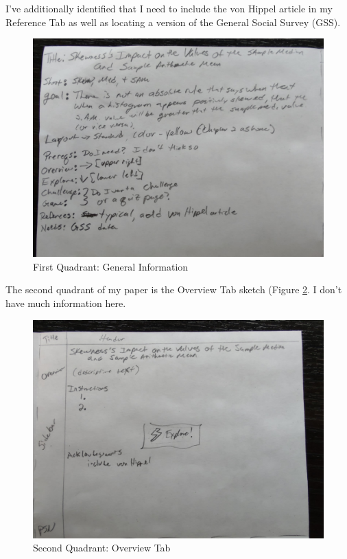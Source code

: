 \documentclass[
]{book}
\begin{document}
I've additionally identified that I need to include the von Hippel article in my Reference Tab as well as locating a version of the General Social Survey (GSS).

\begin{figure}

{\centering \includegraphics[width=22.22in]{images/planSketches/planSketch2-Info} 

}

\caption{First Quadrant: General Information}\label{fig:planSketchInfo}
\end{figure}

The second quadrant of my paper is the Overview Tab sketch (Figure \ref{fig:planSketchOverview}. I don't have much information here.

\begin{figure}

{\centering \includegraphics[width=22.22in]{images/planSketches/planSketch3-Overview} 

}

\caption{Second Quadrant: Overview Tab}\label{fig:planSketchOverview}
\end{figure}
\end{document}
